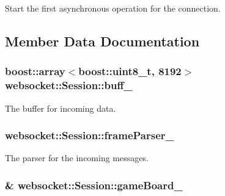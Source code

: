Start the first asynchronous operation for the connection. 



\subsection{Member Data Documentation}
\subsubsection[{\texorpdfstring{buff\+\_\+}{buff_}}]{\setlength{\rightskip}{0pt plus 5cm}boost\+::array$<$boost\+::uint8\+\_\+t, 8192$>$ websocket\+::\+Session\+::buff\+\_\+\hspace{0.3cm}{\ttfamily [private]}}\hypertarget{classwebsocket_1_1Session_a4a7ca92db9c843899fbf3673fe5b9f52}{}\label{classwebsocket_1_1Session_a4a7ca92db9c843899fbf3673fe5b9f52}


The buffer for incoming data. 

\subsubsection[{\texorpdfstring{frame\+Parser\+\_\+}{frameParser_}}]{ websocket\+::\+Session\+::frame\+Parser\+\_\+\hspace{0.3cm}{\ttfamily [private]}}\hypertarget{classwebsocket_1_1Session_add7f041fe3badd9bea5158a412d4c33b}{}\label{classwebsocket_1_1Session_add7f041fe3badd9bea5158a412d4c33b}


The parser for the incoming messages. 

\subsubsection[{\texorpdfstring{game\+Board\+\_\+}{gameBoard_}}]{\& websocket\+::\+Session\+::game\+Board\+\_\+\hspace{0.3cm}{\ttfamily [private]}}\hypertarget{classwebsocket_1_1Session_add75c0a25f69839df5441997846b3f3e}{}\label{classwebsocket_1_1Session_add75c0a25f69839df5441997846b3f3e}


